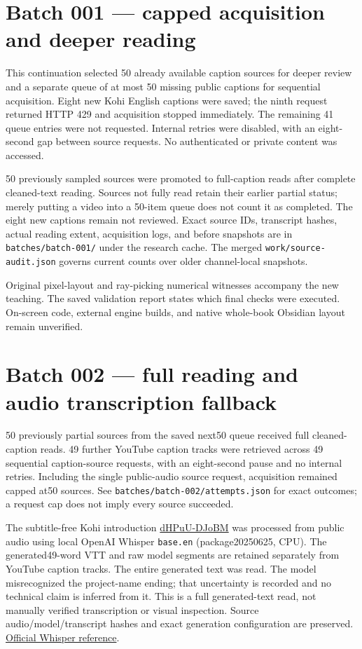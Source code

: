 \section{Batch 001 --- capped acquisition and deeper reading}\label{appendix-877738f6f4d2-batch-001-capped-acquisition-and-deeper-reading}

This continuation selected 50 already available caption sources for deeper review and a separate queue of at most 50 missing public captions for sequential acquisition. Eight new Kohi English captions were saved; the ninth request returned HTTP 429 and acquisition stopped immediately. The remaining 41 queue entries were not requested. Internal retries were disabled, with an eight-second gap between source requests. No authenticated or private content was accessed.

50 previously sampled sources were promoted to full-caption reads after complete cleaned-text reading. Sources not fully read retain their earlier partial status; merely putting a video into a 50-item queue does not count it as completed. The eight new captions remain not reviewed. Exact source IDs, transcript hashes, actual reading extent, acquisition logs, and before snapshots are in \texttt{batches/batch-001/} under the research cache. The merged \texttt{work/source-audit.json} governs current counts over older channel-local snapshots.

Original pixel-layout and ray-picking numerical witnesses accompany the new teaching. The saved validation report states which final checks were executed. On-screen code, external engine builds, and native whole-book Obsidian layout remain unverified.

\section{Batch 002 --- full reading and audio transcription fallback}\label{appendix-877738f6f4d2-batch-002-full-reading-and-audio-transcription-fallback}

50 previously partial sources from the saved next50 queue received full cleaned-caption reads. 49 further YouTube caption tracks were retrieved across 49 sequential caption-source requests, with an eight-second pause and no internal retries. Including the single public-audio source request, acquisition remained capped at50 sources. See \texttt{batches/batch-002/attempts.json} for exact outcomes; a request cap does not imply every source succeeded.

The subtitle-free Kohi introduction \href{https://www.youtube.com/watch?v=dHPuU-DJoBM}{dHPuU-DJoBM} was processed from public audio using local OpenAI Whisper \texttt{base.en} (package20250625, CPU). The generated49-word VTT and raw model segments are retained separately from YouTube caption tracks. The entire generated text was read. The model misrecognized the project-name ending; that uncertainty is recorded and no technical claim is inferred from it. This is a full generated-text read, not manually verified transcription or visual inspection. Source audio/model/transcript hashes and exact generation configuration are preserved. \href{https://github.com/openai/whisper}{Official Whisper reference}.

